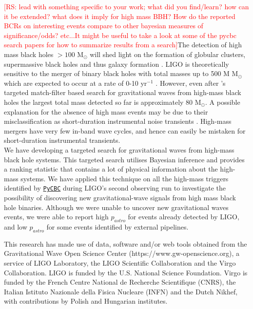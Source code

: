 \documentclass[%
preprint,
 amsmath,amssymb,
 aps,
]{revtex4}
\newcommand{\pycbc}{{\sc \href{https://pycbc.org/}{\texttt{PyCBC}}}\xspace}
\newcommand{\msun}{{\sc M${}_\odot$}\xspace}
\newcommand{\rs}[1]{\textcolor{red}{[RS: #1]}}
\begin{document}
\rs{lead with something specific to your work; what did you find/learn? how can it be extended? what does it imply for high mass BBH? How do the reported BCRs on interesting events compare to other bayesian measures of significance/odds? etc...It might be useful to take a look at some of the pycbc search papers for how to summarize results from a search}The detection of high mass black holes $>100$ \msun will shed light on the formation of globular clusters, supermassive black holes and thus galaxy formation \citep{lodato2006supermassive, 2018IMBHreview}. LIGO is theoretically sensitive to the merger of binary black holes with total masses up to 500 M \msun which are expected to occur at a rate of 0-10 yr\(^{-1}\) \cite{mandel2008rates, fregeau2006imbhbRatePrediction}. However, even after \citet{ligo_imbh_search}'s targeted match-filter based search for gravitational waves from high-mass black holes the largest total mass detected so far is approximately 80 \msun \citep{abbott2019gwtc}. A possible explanation for the absence of high mass events may be due to their misclassification as short-duration instrumental noise transients \citep{blipGlitches}. High-mass mergers have very few in-band wave cycles, and hence can easily be mistaken for short-duration instrumental transients. \\

We have developing a targeted search for gravitational waves from high-mass black hole systems. This targeted search utilises Bayesian inference and provides a ranking statistic that contains a lot of physical information about the high-mass systems. We have applied this technique on all the high-mass triggers identified by \pycbc during LIGO's second observing run to investigate the possibility of discovering new gravitational-wave signals from high mass black hole binaries. Although we were unable to uncover new gravitational waves events, we were able to report high $p_{astro}$ for events already detected by LIGO, and low $p_{astro}$ for some events identified by external pipelines. 

\begin{acknowledgments}

This research has made use of data, software and/or web tools obtained from the Gravitational Wave Open Science Center (https://www.gw-openscience.org), a service of LIGO Laboratory, the LIGO Scientific Collaboration and the Virgo Collaboration. LIGO is funded by the U.S. National Science Foundation. Virgo is funded by the French Centre National de Recherche Scientifique (CNRS), the Italian Istituto Nazionale della Fisica Nucleare (INFN) and the Dutch Nikhef, with contributions by Polish and Hungarian institutes.

\end{acknowledgments}



\end{document}
